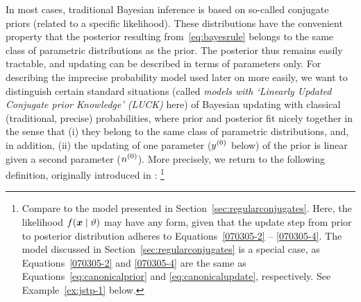 In most cases, traditional Bayesian inference is based on so-called
conjugate priors (related to a specific likelihood). These
distributions have the convenient property that the posterior
resulting from~\eqref{eq:bayesrule} belongs to the same class of parametric
distributions as the prior. The posterior thus remains easily
tractable, and updating can be described in terms of parameters
only. For describing the imprecise probability model used later on more easily, we want to
distinguish certain standard situations (called
\emph{models with `Linearly Updated Conjugate prior Knowledge'
(LUCK)} here) of Bayesian updating with classical (traditional, precise)
probabilities, where prior and posterior fit nicely together in the sense that
(i) they belong to the same class of parametric distributions, and, in addition,
(ii) the updating of one parameter ($y^{(0)}$ below) of the prior is
linear given a second parameter ($n^{(0)}$).
More precisely, we return to the following definition,
originally introduced in \textcite{Walter2007a}:%
\footnote{Compare to the model presented in Section~\ref{sec:regularconjugates}.
Here, the likelihood $f({\bm x}\mid\vartheta)$ may have any form,
given that the update step from prior to posterior distribution
adheres to Equations~\eqref{070305-2} -- \eqref{070305-4}.
The model discussed in Section~\ref{sec:regularconjugates} is a special case,
as Equations~\eqref{070305-2} and \eqref{070305-4} are the same as
Equations~\eqref{eq:canonicalprior} and \eqref{eq:canonicalupdate}, respectively.
See Example~\ref{ex:jstp-1} below.}

